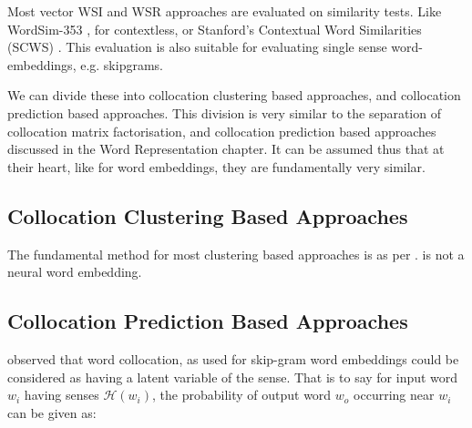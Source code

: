 \documentclass[12pt,parskip]{komatufte}
\begin{document}
Most vector WSI and WSR approaches are evaluated on similarity tests.
Like WordSim-353 \textcite{WordSim353}, for contextless, or Stanford's Contextual Word Similarities (SCWS) \textcite{Huang2012}.
This evaluation is also suitable for evaluating single sense word-embeddings, e.g. skipgrams.


We can divide these into collocation clustering based approaches,
and collocation prediction based approaches.
This division is very similar to the separation of collocation matrix factorisation,
and collocation prediction based approaches discussed in the Word Representation chapter.
It can be assumed thus that at their heart, like for word embeddings,
they are fundamentally very similar.


\subsection{Collocation Clustering Based Approaches}
The fundamental method for most clustering based approaches is as per .
\textcite{pantel2002WSI} is not a neural word embedding.

\subsection{Collocation Prediction Based Approaches}


 observed that word collocation, as used for skip-gram word embeddings could be considered as having a latent variable of the sense.
That is to say for input word $w_i$ having senses $\mathcal{H}(w_i)$,
the probability of output word $w_o$ occurring near $w_i$ can be given as:
\end{document}
